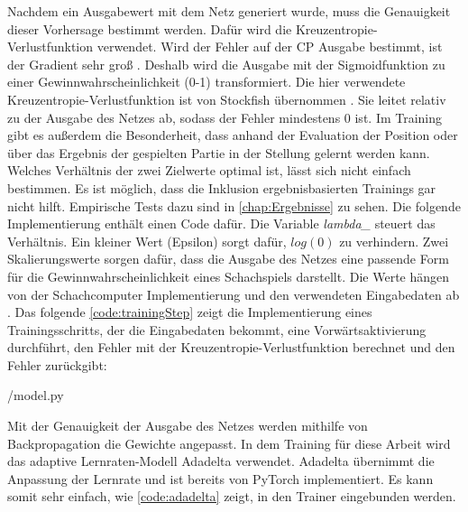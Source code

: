 Nachdem ein Ausgabewert mit dem Netz generiert wurde, muss die Genauigkeit dieser Vorhersage bestimmt werden. Dafür wird die Kreuzentropie-Verlustfunktion verwendet. Wird der Fehler auf der \acl{CP} Ausgabe bestimmt, ist der Gradient sehr groß \cite{StockfishNNUE}. Deshalb wird die Ausgabe mit der Sigmoidfunktion zu einer Gewinnwahrscheinlichkeit (0-1) transformiert. Die hier verwendete Kreuzentropie-Verlustfunktion ist von Stockfish übernommen \cite{StockfishNNUE}. Sie leitet relativ zu der Ausgabe des Netzes ab, sodass der Fehler mindestens 0 ist. Im Training gibt es außerdem die Besonderheit, dass anhand der Evaluation der Position oder über das Ergebnis der gespielten Partie in der Stellung gelernt werden kann. Welches Verhältnis der zwei Zielwerte optimal ist, lässt sich nicht einfach bestimmen. Es ist möglich, dass die Inklusion ergebnisbasierten Trainings gar nicht hilft. Empirische Tests dazu sind in \autoref{chap:Ergebnisse} zu sehen. Die folgende Implementierung enthält einen Code dafür. Die Variable \emph{lambda\_} steuert das Verhältnis. Ein kleiner Wert (Epsilon) sorgt dafür, $log(0)$ zu verhindern. Zwei Skalierungswerte sorgen dafür, dass die Ausgabe des Netzes eine passende Form für die Gewinnwahrscheinlichkeit eines Schachspiels darstellt. Die Werte hängen von der Schachcomputer Implementierung und den verwendeten Eingabedaten ab \cite{StockfishNNUE}. Das folgende \autoref{code:trainingStep} zeigt die Implementierung eines Trainingsschritts, der die Eingabedaten bekommt, eine Vorwärtsaktivierung durchführt, den Fehler mit der Kreuzentropie-Verlustfunktion berechnet und den Fehler zurückgibt:


{\srcloc/model.py}

Mit der Genauigkeit der Ausgabe des Netzes werden mithilfe von Backpropagation die Gewichte angepasst. In dem Training für diese Arbeit wird das adaptive Lernraten-Modell Adadelta \cite{Zeiler2012} verwendet. Adadelta übernimmt die Anpassung der Lernrate und ist bereits von PyTorch implementiert. Es kann somit sehr einfach, wie \autoref{code:adadelta} zeigt, in den Trainer eingebunden werden.

